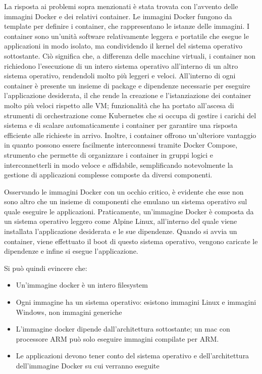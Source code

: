 La risposta ai problemi sopra menzionati è stata trovata con l'avvento delle immagini Docker e dei relativi container.
Le immagini Docker fungono da template per definire i container, che rappresentano le istanze delle immagini. I
container sono un'unità software relativamente leggera e portatile che esegue le applicazioni in modo isolato, ma
condividendo il kernel del sistema operativo sottostante. Ciò significa che, a differenza delle macchine virtuali, i
container non richiedono l'esecuzione di un intero sistema operativo all'interno di un altro sistema operativo,
rendendoli molto più leggeri e veloci. All'interno di ogni container è presente un insieme di package e dipendenze
necessarie per eseguire l'applicazione desiderata, il che rende la creazione e l'istanziazione dei container molto più
veloci rispetto alle VM; funzionalità che ha portato all'ascesa di strumenti di orchestrazione come Kubernetes che si
occupa di gestire i carichi del sistema e di scalare automaticamente i container per garantire una risposta efficiente
alle richieste in arrivo. Inoltre, i container offrono un'ulteriore vantaggio in quanto possono essere facilmente
interconnessi tramite Docker Compose, strumento che permette di organizzare i container in gruppi logici e
interconnetterli in modo veloce e affidabile, semplificando notevolmente la gestione di applicazioni complesse composte
da diversi componenti.

Osservando le immagini Docker con un occhio critico, è evidente che esse non sono altro che un insieme di componenti che
emulano un sistema operativo sul quale eseguire le applicazioni. Praticamente, un'immagine Docker è composta da un
sistema operativo leggero come Alpine Linux, all'interno del quale viene installata l'applicazione desiderata e le sue
dipendenze. Quando si avvia un container, viene effettuato il boot di questo sistema operativo, vengono caricate le
dipendenze e infine si esegue l'applicazione.

Si può quindi evincere che:
\begin{itemize}
    \item Un'immagine docker è un intero filesystem
    \item Ogni immagine ha un sistema operativo: esistono immagini Linux e immagini Windows, non immagini generiche
    \item L'immagine docker dipende dall'architettura sottostante; un mac con processore ARM può solo eseguire immagini
    compilate per ARM.
    \item Le applicazioni devono tener conto del sistema operativo e dell'architettura dell'immagine Docker su cui
    verranno eseguite
\end{itemize}

